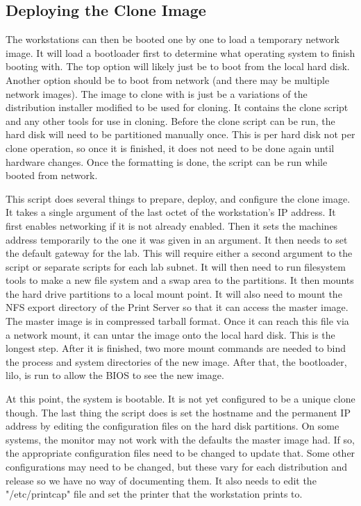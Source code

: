 \subsection{Deploying the Clone Image}
The workstations can then be booted one by one to load a temporary network image.  It will load a bootloader first to determine what operating system to finish booting with.  The top option will likely just be to boot from the local hard disk.  Another option should be to boot from network (and there may be multiple network images).  The image to clone with is just be a variations of the distribution installer modified to be used for cloning.  It contains the clone script and any other tools for use in cloning.  Before the clone script can be run, the hard disk will need to be partitioned manually once.  This is per hard disk not per clone operation, so once it is finished, it does not need to be done again until hardware changes.  Once the formatting is done, the script can be run while booted from network.

This script does several things to prepare, deploy, and configure the clone image.  It takes a single argument of the last octet of the workstation's IP address.  It first enables networking if it is not already enabled.  Then it sets the machines address temporarily to the one it was given in an argument.  It then needs to set the default gateway for the lab.  This will require either a second argument to the script or separate scripts for each lab subnet.  It will then need to run filesystem tools to make a new file system and a swap area to the partitions.  It then mounts the hard drive partitions to a local mount point.  It will also need to mount the NFS export directory of the Print Server so that it can access the master image.  The master image is in compressed tarball format.  Once it can reach this file via a network mount, it can untar the image onto the local hard disk.  This is the longest step.  After it is finished, two more mount commands are needed to bind the process and system directories of the new image.  After that, the bootloader, lilo, is run to allow the BIOS to see the new image.  

At this point, the system is bootable.  It is not yet configured to be a unique clone though.  The last thing the script does is set the hostname and the permanent IP address by editing the configuration files on the hard disk partitions.  On some systems, the monitor may not work with the defaults the master image had.  If so, the appropriate configuration files need to be changed to update that.  Some other configurations may need to be changed, but these vary for each distribution and release so we have no way of documenting them.  It also needs to edit the "/etc/printcap" file and set the printer that the workstation prints to.
